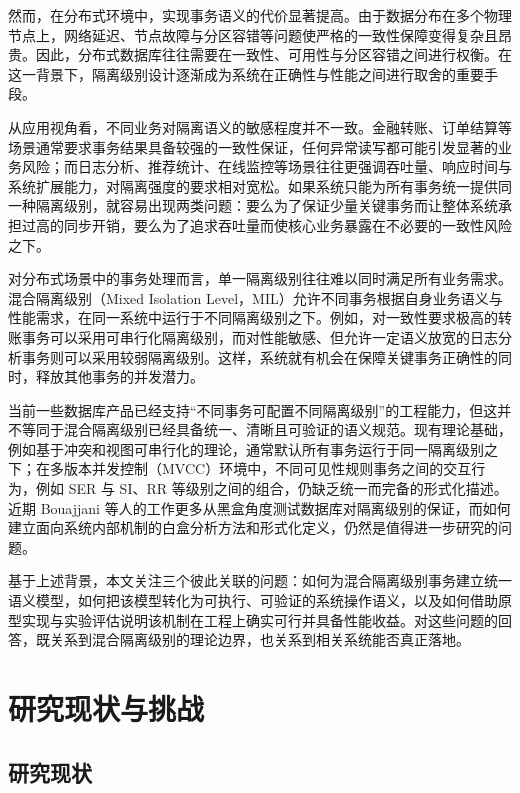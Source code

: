 然而，在分布式环境中，实现事务语义的代价显著提高。由于数据分布在多个物理节点上，网络延迟、节点故障与分区容错等问题使严格的一致性保障变得复杂且昂贵。因此，分布式数据库往往需要在一致性、可用性与分区容错之间进行权衡\cite{Brewer2000, Gilbert2002}。在这一背景下，隔离级别设计逐渐成为系统在正确性与性能之间进行取舍的重要手段。

从应用视角看，不同业务对隔离语义的敏感程度并不一致\cite{bailis2013highly}。金融转账、订单结算等场景通常要求事务结果具备较强的一致性保证，任何异常读写都可能引发显著的业务风险；而日志分析、推荐统计、在线监控等场景往往更强调吞吐量、响应时间与系统扩展能力，对隔离强度的要求相对宽松。如果系统只能为所有事务统一提供同一种隔离级别\cite{crooks2017seeing}，就容易出现两类问题：要么为了保证少量关键事务而让整体系统承担过高的同步开销，要么为了追求吞吐量而使核心业务暴露在不必要的一致性风险之下。

对分布式场景中的事务处理而言，单一隔离级别往往难以同时满足所有业务需求。混合隔离级别（Mixed Isolation Level，MIL）允许不同事务根据自身业务语义与性能需求，在同一系统中运行于不同隔离级别之下\cite{Terry2013, Bailis2014}。例如，对一致性要求极高的转账事务可以采用可串行化隔离级别，而对性能敏感、但允许一定语义放宽的日志分析事务则可以采用较弱隔离级别。这样，系统就有机会在保障关键事务正确性的同时，释放其他事务的并发潜力。

当前一些数据库产品已经支持“不同事务可配置不同隔离级别”的工程能力\cite{taft2020cockroachdb}，但这并不等同于混合隔离级别已经具备统一、清晰且可验证的语义规范。现有理论基础，例如基于冲突和视图可串行化的理论，通常默认所有事务运行于同一隔离级别之下；在多版本并发控制（MVCC）环境中，不同可见性规则事务之间的交互行为，例如 SER 与 SI、RR 等级别之间的组合，仍缺乏统一而完备的形式化描述\cite{cerone2015framework,Shui2023Consistency}。近期 Bouajjani 等人的工作\cite{bouajjani2025complexity}更多从黑盒角度测试数据库对隔离级别的保证，而如何建立面向系统内部机制的白盒分析方法和形式化定义，仍然是值得进一步研究的问题。

基于上述背景，本文关注三个彼此关联的问题：如何为混合隔离级别事务建立统一语义模型，如何把该模型转化为可执行、可验证的系统操作语义，以及如何借助原型实现与实验评估说明该机制在工程上确实可行并具备性能收益。对这些问题的回答，既关系到混合隔离级别的理论边界，也关系到相关系统能否真正落地。

\section{研究现状与挑战}
\subsection{研究现状}

